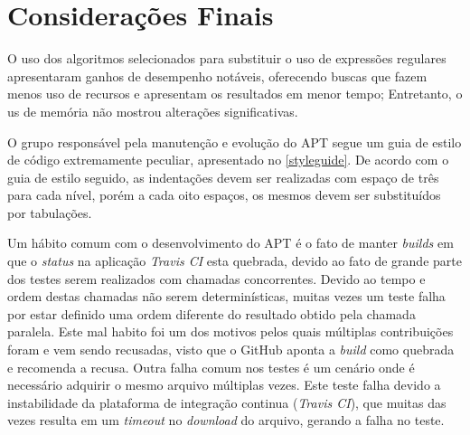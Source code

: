 \chapter{Considerações Finais} %
\label{cha:dificuldades_encontradas}


O uso dos algoritmos selecionados  para substituir o uso de expressões regulares apresentaram ganhos de desempenho notáveis, oferecendo buscas que fazem menos uso de recursos e apresentam os resultados em menor tempo; Entretanto, o us de memória não mostrou  alterações significativas.


O grupo responsável pela manutenção e evolução do {\code APT} segue um guia de estilo de código extremamente peculiar, apresentado no \autoref{styleguide}. De acordo com o guia de estilo seguido, as indentações devem ser realizadas com espaço de três para cada nível, porém a cada oito espaços, os mesmos devem ser substituídos por tabulações.


Um hábito comum com o desenvolvimento do {\code APT} é o fato de manter \textit{builds} em que o \textit{status} na aplicação \textit{Travis CI} esta quebrada, devido ao fato de grande parte dos testes serem realizados com chamadas concorrentes. Devido ao tempo e ordem destas chamadas não serem determinísticas, muitas vezes um teste falha por estar definido uma ordem diferente do resultado obtido pela chamada paralela.
Este mal habito foi um dos motivos pelos quais múltiplas contribuições foram e vem sendo recusadas, visto que o GitHub aponta a \textit{build} como quebrada e recomenda a recusa. Outra falha comum nos testes é um cenário onde é necessário adquirir o mesmo arquivo múltiplas vezes. Este teste falha devido a instabilidade da plataforma de integração continua (\textit{Travis CI}), que muitas das vezes resulta em um \textit{timeout} no \textit{download} do arquivo, gerando a falha no teste.




